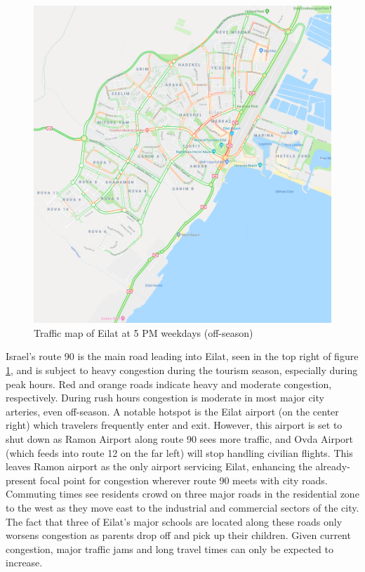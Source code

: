 \documentclass[12pt]{article}                       %
\begin{document}
\begin{figure}[H]
    \centering
    \includegraphics[scale=1]{images/eilat_traffic.png}
    \caption{Traffic map of Eilat at 5 PM weekdays (off-season)}
    \label{img:eilatTraffic}
\end{figure}

Israel's route 90 is the main road leading into Eilat, seen in the top right of figure \ref{img:eilatTraffic}, and is subject to heavy congestion during the tourism season, especially during peak hours. Red and orange roads indicate heavy and moderate congestion, respectively. During rush hours congestion is moderate in most major city arteries, even off-season. A notable hotspot is the Eilat airport (on the center right) which travelers frequently enter and exit. However, this airport is set to shut down as Ramon Airport along route 90 sees more traffic, and Ovda Airport (which feeds into route 12 on the far left) will stop handling civilian flights. This leaves Ramon airport as the only airport servicing Eilat, enhancing the already-present focal point for congestion wherever route 90 meets with city roads. Commuting times see residents crowd on three major roads in the residential zone to the west as they move east to the industrial and commercial sectors of the city. The fact that three of Eilat's major schools are located along these roads only worsens congestion as parents drop off and pick up their children. Given current congestion, major traffic jams and long travel times can only be expected to increase.
\end{document}
